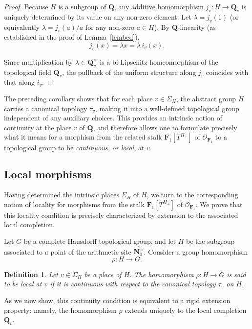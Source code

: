 \documentclass[11pt,a4paper]{article}
\newtheorem{definition}[theorem]{Definition}
\newcommand{\N}{\mathbf{N}}
\newcommand{\Q}{\mathbf{Q}}
\newcommand{\cO}{\mathcal O}
\newcommand{\Fone}{\mathbf{F}_{1}}
\begin{document}
\begin{proof}
Because $H$ is a subgroup of $\Q$, 
any additive homomorphism 
$j_v: H \to \Q_v$ 
is uniquely determined by its value 
on any non-zero element. 
Let $\lambda = j_v(1)$ 
(or equivalently $\lambda = j_v(a)/a$ 
for any non-zero $a \in H$). 
By $\Q$-linearity 
(as established in the proof of 
Lemma~\ref{lembed}), 
\[
j_v(x) 
= \lambda x 
= \lambda\, i_v(x).
\]

Since multiplication by 
$\lambda \in \Q_v^\times$ 
is a bi-Lipschitz homeomorphism 
of the topological field $\Q_v$, 
the pullback of the uniform structure 
along $j_v$ coincides with that 
along $i_v$.
\end{proof}

The preceding corollary shows that for each place
$v\in\Sigma_H$, the abstract group $H$ carries a canonical topology
$\tau_v$, making it into a well-defined topological group independent of any auxiliary choices. This provides an intrinsic notion of continuity at the place $v$ of $\Q$, and therefore allows one to formulate precisely what it means for a morphism from the related stalk $\Fone[T^{H_+}]$ of $\cO_{\Fone}$ to a topological group to be \emph{continuous, or local}, at $v$.



\subsection{Local morphisms}

Having determined the intrinsic places $\Sigma_H$ of $H$, we turn to the corresponding notion of locality for morphisms from the stalk $\Fone[T^{H_+}]$ of $\cO_{\Fone}$. We prove that this locality condition is precisely characterized by extension to the associated local completion.\vspace{.03in}

Let $G$ be a complete Hausdorff topological group, 
and let $H$ be the subgroup associated to a point 
of the arithmetic site $\widehat{\N^\times_0}$. 
Consider a group homomorphism
\[
\rho:H\to G.
\]

\begin{definition}\label{defnloc}
Let $v\in\Sigma_H$ be a place of $H$. 
The homomorphism $\rho:H\to G$ 
is said to be \emph{local at $v$} 
if it is continuous with respect to the canonical topology $\tau_v$ on $H$.
\end{definition}

As we now show, this continuity condition is equivalent to a rigid extension property: namely, the homomorphism $\rho$ extends uniquely to the local completion $\Q_v$.
\end{document}
